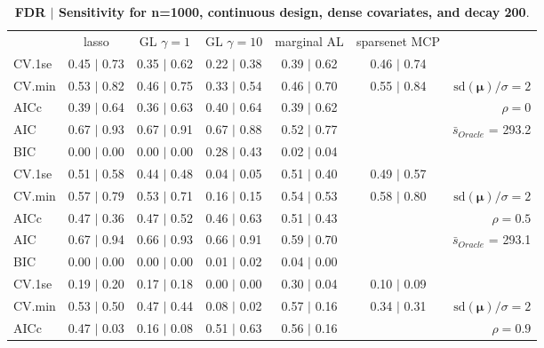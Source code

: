 \clearpage
\begin{table}\vspace{-.5cm}
\caption[l]{ {\it }
{ \bf FDR $\boldsymbol{\mid}$ Sensitivity for n=1000, continuous design, dense covariates, and  decay  200}.}
\vspace{-.5cm}
\footnotesize{}
\begin{center}
\begin{tabular}{l*{5}{c}|r}
 & lasso & GL $\gamma=1$ & GL $\gamma=10$ & marginal AL & sparsenet MCP  & \\
 \cline{1-7}
CV.1se & 0.45 $\mid$ 0.73 & 0.35 $\mid$ 0.62 & 0.22 $\mid$ 0.38 & 0.39 $\mid$ 0.62 & 0.46 $\mid$ 0.74 & \\
CV.min & 0.53 $\mid$ 0.82 & 0.46 $\mid$ 0.75 & 0.33 $\mid$ 0.54 & 0.46 $\mid$ 0.70 & 0.55 $\mid$ 0.84 &  $\mathrm{sd}(\mathbf{\mu})/\sigma=2$ \\
AICc & 0.39 $\mid$ 0.64 & 0.36 $\mid$ 0.63 & 0.40 $\mid$ 0.64 & 0.39 $\mid$ 0.62 & & $\rho=0$ \\
AIC & 0.67 $\mid$ 0.93 & 0.67 $\mid$ 0.91 & 0.67 $\mid$ 0.88 & 0.52 $\mid$ 0.77 & &  \multirow{2}{*}{$\bar{s}_{Oracle}$ = 293.2} \\
BIC & 0.00 $\mid$ 0.00 & 0.00 $\mid$ 0.00 & 0.28 $\mid$ 0.43 & 0.02 $\mid$ 0.04 & &  \\
 \hline 
CV.1se & 0.51 $\mid$ 0.58 & 0.44 $\mid$ 0.48 & 0.04 $\mid$ 0.05 & 0.51 $\mid$ 0.40 & 0.49 $\mid$ 0.57 & \\
CV.min & 0.57 $\mid$ 0.79 & 0.53 $\mid$ 0.71 & 0.16 $\mid$ 0.15 & 0.54 $\mid$ 0.53 & 0.58 $\mid$ 0.80 &  $\mathrm{sd}(\mathbf{\mu})/\sigma=2$ \\
AICc & 0.47 $\mid$ 0.36 & 0.47 $\mid$ 0.52 & 0.46 $\mid$ 0.63 & 0.51 $\mid$ 0.43 & & $\rho=0.5$ \\
AIC & 0.67 $\mid$ 0.94 & 0.66 $\mid$ 0.93 & 0.66 $\mid$ 0.91 & 0.59 $\mid$ 0.70 & &  \multirow{2}{*}{$\bar{s}_{Oracle}$ = 293.1} \\
BIC & 0.00 $\mid$ 0.00 & 0.00 $\mid$ 0.00 & 0.01 $\mid$ 0.02 & 0.04 $\mid$ 0.00 & &  \\
 \hline 
CV.1se & 0.19 $\mid$ 0.20 & 0.17 $\mid$ 0.18 & 0.00 $\mid$ 0.00 & 0.30 $\mid$ 0.04 & 0.10 $\mid$ 0.09 & \\
CV.min & 0.53 $\mid$ 0.50 & 0.47 $\mid$ 0.44 & 0.08 $\mid$ 0.02 & 0.57 $\mid$ 0.16 & 0.34 $\mid$ 0.31 &  $\mathrm{sd}(\mathbf{\mu})/\sigma=2$ \\
AICc & 0.47 $\mid$ 0.03 & 0.16 $\mid$ 0.08 & 0.51 $\mid$ 0.63 & 0.56 $\mid$ 0.16 & & $\rho=0.9$ \\

\end{tabular}
\end{center}
\end{table}
